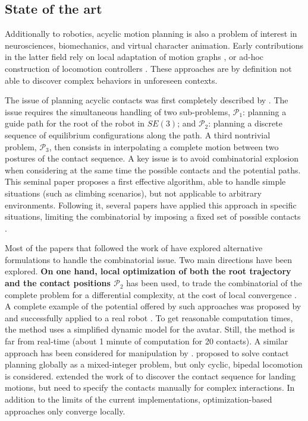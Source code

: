 \subsection{State of the art}



Additionally to robotics, acyclic motion planning is also a problem of interest in neurosciences, biomechanics, and virtual character animation.
Early contributions in the latter field rely on local adaptation of motion graphs \citep{citeulike:220163}, or ad-hoc construction of locomotion controllers \citep{Pettre:2003:LPD:846276.846313}. These approaches are by definition not able to discover complex behaviors in unforeseen contexts.

The issue of planning acyclic contacts was first completely described by \citeauthor{Bretl:2006:MPM:1124573.1124585}. The issue requires the simultaneous handling of two sub-problems, $\mathcal{P}_1$: planning a guide path for the root of the robot in $SE(3)$; and $\mathcal{P}_2$: planning a discrete sequence of equilibrium configurations along the path. A third nontrivial problem, $\mathcal{P}_3$, 
then consists in interpolating a complete motion between two postures of the contact sequence.  A key issue is to avoid combinatorial explosion when considering at the same time the possible contacts and the potential paths. This seminal paper proposes a first effective algorithm, able to handle simple situations (such as climbing scenarios), but not applicable to arbitrary environments. Following it, seve\-ral papers have applied this approach in specific situations, limiting the combinatorial by imposing a fixed set of possible contacts \citep{Hauser06usingmotion, stilman2010}.

Most of the papers that followed the work of \citeauthor{Bretl:2006:MPM:1124573.1124585} have explored alternative formulations to handle the combinatorial issue. Two main directions have been explored. \textbf{On one hand, local optimization of both the root trajectory \Pa and the contact positions $\mathcal{P}_2$} has been used, to trade the combinatorial of the complete problem for a differential complexity, at the cost of local convergence \citep{1631739}. A complete example of the potential offered by such approaches was proposed by \cite{Mordatch:2012:DCB:2185520.2185539} and successfully applied to a real robot \citep{mordatch2015}. To get reasonable computation times, the method uses a simplified dynamic model for the avatar. Still, the method is far from real-time  (about 1 minute of computation for 20 contacts).  A similar approach has been considered for manipulation by \cite{gabicciniisrr15}. \citeauthor{DBLP:conf/humanoids/DeitsT14} proposed to solve contact planning globally as a mixed-integer problem, but only cyclic, bipedal locomotion is considered. 
\citeauthor{dai2014whole} extended the work of \citeauthor{Posa:2014:DMT:2568343.2568352} to discover the contact sequence for landing motions, but need to specify
the contacts manually for complex interactions.
In addition to the limits of the current implementations, optimization-based approaches only converge locally.

